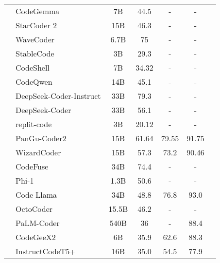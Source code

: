 \begin{table}[t]
{{\begin{tabular}{clccccc}
         & CodeGemma \cite{codegemma_2024}  & 7B  & 44.5 & - & - & \\
         & StarCoder 2 \cite{lozhkov2024starcoder}  & 15B & 46.3 & - & - & \\
         & WaveCoder \cite{yu2023wavecoder} & 6.7B & 75 & - & - & \\
         & StableCode \cite{pinnaparaju2024stable} & 3B & 29.3 & - & - & \\
         & CodeShell \cite{xie2024codeshell} & 7B & 34.32 & - & - & \\
         & CodeQwen \cite{codeqwen} & 14B & 45.1 & - & -& \\
         & DeepSeek-Coder-Instruct \cite{guo2024deepseek} & 33B & 79.3 & - & - & \\
         & DeepSeek-Coder \cite{guo2024deepseek} & 33B & 56.1 & - & - & \\
         & replit-code \cite{replit-code} & 3B & 20.12 & - & - & \\
         & PanGu-Coder2 \cite{shen2023pangu} & 15B & 61.64   & 79.55    & 91.75    & \\
         & WizardCoder \cite{luo2023wizardcoder} & 15B & 57.3    & 73.2     & 90.46     & \\
         & CodeFuse \cite{liu2023mftcoder} & 34B & 74.4    & -        & -         & \\
         & Phi-1 \cite{gunasekar2023textbooks} & 1.3B & 50.6    & -        & -         & \\
         & Code Llama \cite{roziere2023code} & 34B & 48.8    & 76.8     & 93.0      & \\
         & OctoCoder \cite{muennighoff2023octopack} & 15.5B & 46.2    & -        & -         & \\
         & PaLM-Coder \cite{chowdhery2023palm} & 540B & 36      & -        & 88.4      & \\
         & CodeGeeX2 \cite{zheng2023codegeex} & 6B & 35.9    & 62.6     & 88.3      & \\
         & InstructCodeT5+ \cite{wang2023codet5+} & 16B & 35.0    & 54.5     & 77.9      & \\

\end{tabular}}}
\end{table}
